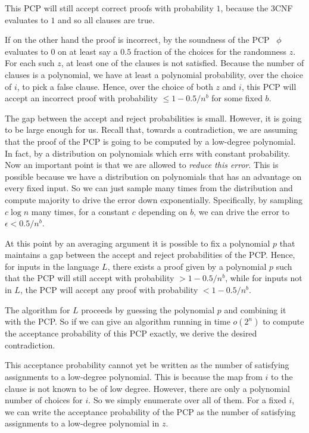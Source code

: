 \documentclass{toc}
\newcommand{\e}{\epsilon}
\begin{document}
This PCP will still accept correct proofs with probability $1$, because
the 3CNF evaluates to $1$ and so all clauses are true.

If on the other hand the proof is incorrect, by the soundness of the
PCP~\cite{Ben-SassonV-AC0PCP} $\phi$ evaluates to $0$ on at least
say a $0.5$ fraction of the choices for the randomness $z$. For
each such $z$, at least one of the clauses is not satisfied. Because
the number of clauses is a polynomial, we have at least a polynomial
probability, over the choice of $i$, to pick a false clause. Hence,
over the choice of both $z$ and $i$, this PCP will accept an incorrect
proof with probability $\le1-0.5/n^{b}$ for some fixed $b$.

The gap between the accept and reject probabilities is small. However,
it is going to be large enough for us. Recall that, towards a contradiction,
we are assuming that the proof of the PCP is going to be computed
by a low-degree polynomial. In fact, by a distribution on polynomials
which errs with constant probability. Now an important point is that
we are allowed to \emph{reduce this error}. This is possible because
we have a distribution on polynomials that has an advantage on every
fixed input. So we can just sample many times from the distribution
and compute majority to drive the error down exponentially. Specifically,
by sampling $c\log n$ many times, for a constant $c$ depending on
$b$, we can drive the error to $\e<0.5/n^{b}$.

At this point by an averaging argument it is possible to fix a polynomial
$p$ that maintains a gap between the accept and reject probabilities
of the PCP. Hence, for inputs in the language $L$, there exists a
proof given by a polynomial $p$ such that the PCP will still accept
with probability $>1-0.5/n^{b}$, while for inputs not in $L$, the
PCP will accept any proof with probability $<1-0.5/n^{b}$.

The algorithm for $L$ proceeds by guessing the polynomial $p$ and
combining it with the PCP. So if we can give an algorithm running
in time $o(2^{n})$ to compute the acceptance probability of this
PCP exactly, we derive the desired contradiction.

This acceptance probability cannot yet be written as the number of
satisfying assignments to a low-degree polynomial. This is because
the map from $i$ to the clause is not known to be of low degree.
However, there are only a polynomial number of choices for $i$. So
we simply enumerate over all of them. For a fixed $i$, we can write
the acceptance probability of the PCP as the number of satisfying
assignments to a low-degree polynomial in $z$.
\end{document}
